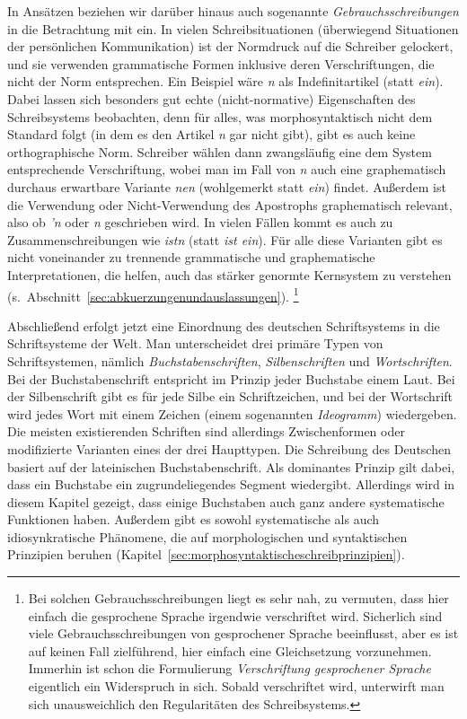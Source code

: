 In Ansätzen beziehen wir darüber hinaus auch sogenannte \textit{Gebrauchsschreibungen} in die Betrachtung mit ein.
In vielen Schreibsituationen (überwiegend Situationen der persönlichen Kommunikation) ist der Normdruck auf die Schreiber gelockert, und sie verwenden grammatische Formen inklusive deren Verschriftungen, die nicht der Norm entsprechen.
Ein Beispiel wäre \textit{n} als Indefinitartikel (statt \textit{ein}).
Dabei lassen sich besonders gut echte (nicht-normative) Eigenschaften des Schreibsystems beobachten, denn für alles, was morphosyntaktisch nicht dem Standard folgt (in dem es den Artikel \textit{n} gar nicht gibt), gibt es auch keine orthographische Norm.
Schreiber wählen dann zwangsläufig eine dem System entsprechende Verschriftung, wobei man im Fall von \textit{n} auch eine graphematisch durchaus erwartbare Variante \textit{nen} (wohlgemerkt statt \textit{ein}) findet.
Außerdem ist die Verwendung oder Nicht-Verwendung des Apostrophs graphematisch relevant, also ob \textit{'n} oder \textit{n} geschrieben wird.
In vielen Fällen kommt es auch zu Zusammenschreibungen wie \textit{istn} (statt \textit{ist ein}).
Für alle diese Varianten gibt es nicht voneinander zu trennende grammatische und graphematische Interpretationen, die helfen, auch das stärker genormte Kernsystem zu verstehen (s.\ Abschnitt~\ref{sec:abkuerzungenundauslassungen}).%
\footnote{Bei solchen Gebrauchsschreibungen liegt es sehr nah, zu vermuten, dass hier einfach die gesprochene Sprache irgendwie verschriftet wird.
Sicherlich sind viele Gebrauchsschreibungen von gesprochener Sprache beeinflusst, aber es ist auf keinen Fall zielführend, hier einfach eine Gleichsetzung vorzunehmen.
Immerhin ist schon die Formulierung \textit{Verschriftung gesprochener Sprache} eigentlich ein Widerspruch in sich.
Sobald verschriftet wird, unterwirft man sich unausweichlich den Regularitäten des Schreibsystems.}

Abschließend erfolgt jetzt eine Einordnung des deutschen Schriftsystems in die Schriftsysteme der Welt.
Man unterscheidet drei primäre Typen von Schriftsystemen, nämlich \textit{Buchstabenschriften}, \textit{Silbenschriften} und \textit{Wortschriften}.
Bei der Buchstabenschrift entspricht im Prinzip jeder Buchstabe einem Laut.
Bei der Silbenschrift gibt es für jede Silbe ein Schriftzeichen, und bei der Wortschrift wird jedes Wort mit einem Zeichen (einem sogenannten \textit{Ideogramm}) wiedergeben.
Die meisten existierenden Schriften sind allerdings Zwischenformen oder modifizierte Varianten eines der drei Haupttypen.
Die Schreibung des Deutschen basiert auf der lateinischen Buchstabenschrift.
Als dominantes Prinzip gilt dabei, dass ein Buchstabe ein zugrundeliegendes Segment wiedergibt.
Allerdings wird in diesem Kapitel gezeigt, dass einige Buchstaben auch ganz andere systematische Funktionen haben.
Außerdem gibt es sowohl systematische als auch idiosynkratische Phänomene, die auf morphologischen und syntaktischen Prinzipien beruhen (Kapitel~\ref{sec:morphosyntaktischeschreibprinzipien}).


